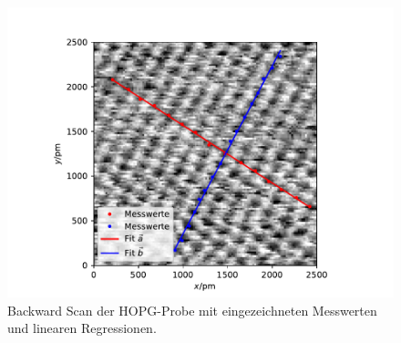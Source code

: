 \begin{figure}
  \centering
  \includegraphics[width = \textwidth]{../Messdaten/bilder/fit_01_backward.pdf}
  \caption{Backward Scan der HOPG-Probe mit eingezeichneten Messwerten und linearen Regressionen.}
  \label{fig: backward}
\end{figure}




